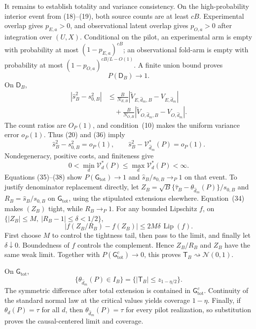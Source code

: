 It remains to establish totality and variance consistency. On the high-probability interior event from (18)--(19), both source counts are at least \(cB\). Experimental overlap gives \(p_{E,a}>0\), and observational latent overlap gives \(p_{O,a}>0\) after integration over \((U,X)\). Conditional on the pilot, an experimental arm is empty with probability at most \((1-p_{E,a})^{cB}\); an observational fold-arm is empty with probability at most \((1-p_{O,a})^{cB/L-O(1)}\). A finite union bound proves
\[
P(\mathsf D_B)\longrightarrow1. \tag{35}
\]
On \(\mathsf D_B\),
\[
\begin{aligned}
|\widehat s_B^2-s_{0,B}^2|
&\le\frac{B}{N_{E,B}}
|\widetilde V_{E,\widehat d_m,B}-V_{E,\widehat d_m}|\\
&\quad+\frac{B}{N_{O,B}}
|\widetilde V_{O,\widehat d_m,B}-V_{O,\widehat d_m}|.
\end{aligned} \tag{36}
\]
The count ratios are \(O_P(1)\), and condition~(10) makes the uniform variance error \(o_P(1)\). Thus (20) and (36) imply
\[
\widehat s_B^2-s_{0,B}^2=o_P(1),\qquad
\widehat s_B^2-\mathcal V_{\widehat d_m}^*(P)=o_P(1). \tag{37}
\]
Nondegeneracy, positive costs, and finiteness give
\[
0<\min_d\mathcal V_d^*(P)\le\max_d\mathcal V_d^*(P)<\infty. \tag{38}
\]
Equations (35)--(38) show \(P(\mathsf G_{\mathrm{tot}})\to1\) and \(\widehat s_B/s_{0,B}\to_P1\) on that event. To justify denominator replacement directly, let \(Z_B=\sqrt B\{\widehat\tau_B-\theta_{\widehat d_m}(P)\}/s_{0,B}\) and \(R_B=\widehat s_B/s_{0,B}\) on \(\mathsf G_{\mathrm{tot}}\), using the stipulated extensions elsewhere. Equation~(34) makes \((Z_B)\) tight, while \(R_B\to_P1\). For any bounded Lipschitz \(f\), on \(\{|Z_B|\le M,\ |R_B-1|\le\delta<1/2\}\),
\[
|f(Z_B/R_B)-f(Z_B)|\le2M\delta\,\operatorname{Lip}(f).
\]
First choose \(M\) to control the tightness tail, then pass to the limit, and finally let \(\delta\downarrow0\). Boundedness of \(f\) controls the complement. Hence \(Z_B/R_B\) and \(Z_B\) have the same weak limit. Together with \(P(\mathsf G_{\mathrm{tot}}^c)\to0\), this proves \(\mathsf T_B\rightsquigarrow\mathcal N(0,1)\).

On \(\mathsf G_{\mathrm{tot}}\),
\[
\{\theta_{\widehat d_m}(P)\in I_B\}
=\{|\mathsf T_B|\le z_{1-\eta/2}\}.
\]
The symmetric difference after total extension is contained in \(\mathsf G_{\mathrm{tot}}^c\). Continuity of the standard normal law at the critical values yields coverage \(1-\eta\). Finally, if \(\theta_d(P)=\tau\) for all \(d\), then \(\theta_{\widehat d_m}(P)=\tau\) for every pilot realization, so substitution proves the causal-centered limit and coverage.